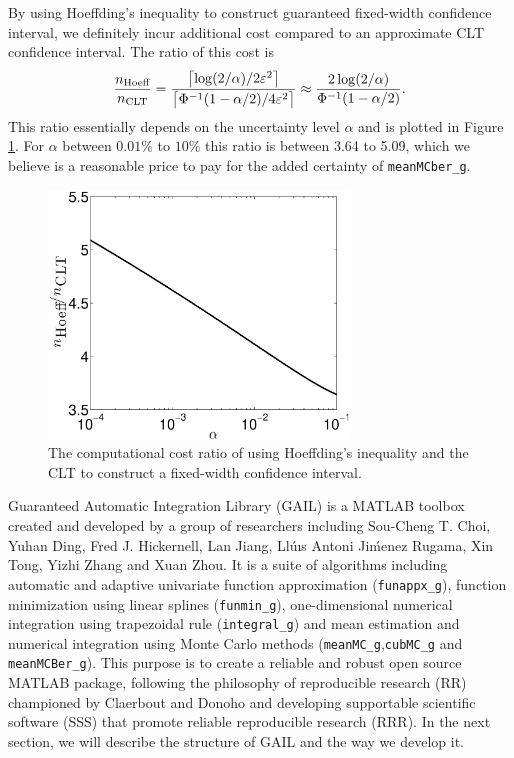 \documentclass{iitthesis}
\begin{document}
By using Hoeffding's inequality to construct guaranteed fixed-width confidence interval, we definitely incur additional cost compared to an approximate CLT confidence interval.  The ratio of this cost is 
\begin{equation}
\frac{n_{\text{Hoeff}}}{n_{\text{CLT}}} = \frac{\left \lceil \log(2/\alpha)/{2\varepsilon^2} \right \rceil}{\left \lceil{ \Phi^{-1}(1-\alpha/2)}/{4 \varepsilon^2}\right\rceil} \approx  \frac{2\log(2/\alpha)}{\Phi^{-1}(1-\alpha/2)}.
\end{equation}
This ratio essentially depends on the uncertainty level $\alpha$ and is plotted in Figure \ref{fig:ratiovsalpha}. For $\alpha$ between $0.01\%$ to $10\%$ this ratio is between 3.64 to 5.09, which we believe is a reasonable price to pay for the added certainty of {\tt meanMCber\_g}.

  \begin{figure}[htbp]
    \centering
    \includegraphics[width=8cm]{plotHoeffCLTr.eps} %
    \caption{The computational cost ratio of using Hoeffding's inequality and the CLT to construct a fixed-width confidence interval.}
    \label{fig:ratiovsalpha}
 \end{figure}
 
Guaranteed Automatic Integration Library (GAIL) \cite{GAIL_1_3} is a MATLAB toolbox created and developed by a group of researchers including Sou-Cheng T. Choi, Yuhan Ding, Fred J. Hickernell, Lan Jiang, Ll\'{u}ıs Antoni Ji\'{m}enez Rugama, Xin Tong, Yizhi Zhang and Xuan Zhou. It is a suite of algorithms including automatic and adaptive univariate function approximation ({\tt funappx\_g}), function minimization using linear splines ({\tt funmin\_g}), one-dimensional numerical integration using trapezoidal rule ({\tt integral\_g}) and mean estimation and numerical integration using Monte Carlo methods ({\tt meanMC\_g},{\tt cubMC\_g} and {\tt meanMCBer\_g}). This purpose is to create a reliable and robust open source MATLAB package, following the philosophy of reproducible research (RR) championed by Claerbout \cite{Claerbout10} and Donoho\cite{BuckheitDonoho95} and developing supportable scientific software (SSS) that promote reliable reproducible research (RRR). In the next section, we will describe the structure of GAIL and the way we develop it.
\end{document}

